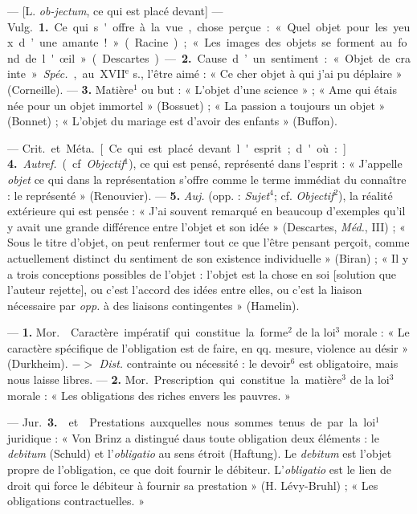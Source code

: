 \begin{itemize}[leftmargin=1cm, label=, itemsep=1pt]
 — [L. {\it ob-jectum}, ce qui est placé devant] — \si{Vulg.}
{\bf 1.} Ce qui s'offre à la vue, chose perçue : « Quel objet pour les yeux
d’une amante ! » (Racine) ; « Les images des objets se forment au fond de
l'œil » (Descartes). — {\bf 2.} Cause d’un sentiment : « Objet de crainte ».
{\it Spéc.}, au {\footnotesize XVII}$^\text{e}$ s., l'être aimé : « Ce cher
objet à qui j'ai pu déplaire » (Corneille). —  {\bf 3.} Matière$^1$ ou but :
« L'objet d’une science » ; « Ame qui étais née pour un objet
immortel » (Bossuet) ; « La passion a toujours un objet » (Bonnet) ;
« L'objet du mariage est d’avoir des enfants » (Buffon).

— \si{Crit.} et \si{Méta.} [Ce qui est placé devant l'esprit; d'où :]. {\bf
4.} {\it Autref.} (cf. {\it Objectif}$^1$), ce qui est pensé, représenté dans
l'esprit : « J’appelle {\it objet} ce qui dans la représentation s'offre
comme le terme immédiat du connaître : le représenté » (Renouvier). — {\bf
5.} {\it Auj.} (opp. : {\it Sujet}$^4$; cf. {\it Objectif}$^2$), la réalité
extérieure qui est pensée : « J’ai souvent remarqué en beaucoup d'exemples
qu'il y avait une grande différence entre l’objet et son idée » (Descartes,
{\it Méd.}, III) ; « Sous le titre d'objet, on peut renfermer tout ce que
l'être pensant perçoit, comme actuellement distinct du sentiment de son
existence individuelle » (Biran) ; « Il
y a trois conceptions possibles de l’objet : l'objet est la chose en soi
[solution que l’auteur rejette], ou c’est l’accord des idées entre elles, ou
c’est la liaison nécessaire par {\it opp.} à des liaisons
contingentes » (Hamelin).

 — {\bf 1.} \si{Mor.}  Caractère impératif qui
constitue la forme$^2$ de la loi$^3$ morale : « Le caractère spécifique de
l'obligation est de faire, en qq. mesure, violence au désir » (Durkheim). $->$
{\it Dist.} contrainte ou nécessité : le devoir$^6$ est obligatoire, mais
nous laisse libres. — {\bf 2.}  \si{Mor.} Prescription qui
constitue la matière$^3$ de la loi$^3$ morale : « Les obligations des riches
envers les pauvres. »

— \si{Jur.} {\bf 3.}  et  Prestations
auxquelles nous sommes tenus de par la loi$^1$ juridique : « Von Brinz a
distingué daus toute obligation deux éléments : le {\it debitum} (Schuld) et
l’{\it obligatio} au sens étroit (Haftung). Le {\it debitum} est l'objet
propre de l'obligation, ce que doit fournir le débiteur. L'{\it obligatio}
est le lien de droit qui force le débiteur à fournir sa prestation » (H.
Lévy-Bruhl) ; « Les obligations contractuelles. »


\end{itemize}
